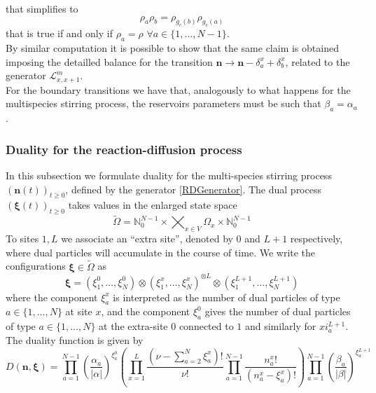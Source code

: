 \documentclass[10pt]{article}
\numberwithin{equation}{section}
\numberwithin{equation}{subsection}
\begin{document}
that simplifies to 
\begin{equation}
	\rho_{a}\rho_{b}=\rho_{g_{c}(b)}\rho_{g_{c}(a)}
\end{equation}
that is true if and only if $\rho_{a}=\rho$ $\forall a\in \{1,\ldots,N-1\}$.\\
By similar computation it is possible to show that the same claim is obtained imposing the detailled balance for the transition $\bm{n}\to \bm{n}-\delta_{a}^{x}+\delta_{b}^{x}$, related to the generator $\mathcal{L}^{m}_{x,x+1}$. \\
For the boundary transitions we have that, analogously to what happens for the multispecies stirring process, the reservoirs parameters must be such that $\beta_{a}=\alpha_{a}$.
\subsubsection{Duality for the reaction-diffusion process}
In this subsection we formulate duality for the multi-species stirring process $(\bm{n}(t))_{t\geq 0}$, defined by the generator \eqref{RDGenerator}.
The dual  process $(\bm{\xi}(t))_{t\geq 0}$ takes values in the enlarged state space
\begin{equation}
	\widetilde{\Omega}=\mathbb{N}_{0}^{N-1}\times  \bigtimes_{x\in V} \Omega_{x}\times \mathbb{N}_{0}^{N-1}
\end{equation}
To sites $1,L$ we associate an ``extra site'', denoted by $0$ and $L+1$ respectively,
where dual particles will accumulate in the course of time. 
We write the configurations $\bm{\xi} \in \widetilde\Omega$  as
\begin{equation}
	\bm{\xi}=\left(\xi_{1}^{0},\ldots,\xi_{N}^{0}\right)\otimes\left(\xi_{1}^{x},\ldots,\xi_{N}^{x}\right)^{\otimes L}\otimes \left(\xi_{1}^{L+1},\ldots,\xi_{N}^{L+1}\right)
\end{equation}
where the component $\xi_{a}^{x}$ is interpreted as the number of dual particles of type $a\in \{1,\ldots,N\}$ at site $x$, 
and the component $\xi_{a}^{0}$  gives the number of dual particles of type $a\in \{1,\ldots,N\}$ at 
the extra-site $0$ connected to $1$ and similarly for $xi_{a}^{L+1}$. \\
The duality function is given by
\begin{equation}
	D(\bm{n},\bm{\xi})=\prod_{a=1}^{N-1}\left(\frac{\alpha_{a}}{|\alpha|}\right)^{\xi_{a}^{0}}\left(\prod_{x=1}^{L}\frac{(\nu -\sum_{a=2}^{N}\xi_{a}^{x})!}{\nu!}\prod_{a=1}^{N-1}\frac{n_{a}^{x}!}{(n_{a}^{x}-\xi_{a}^{x})!}\right)\prod_{a=1}^{N-1}\left(\frac{\beta_{a}}{|\beta|}\right)^{\xi_{a}^{L+1}}
\end{equation}
\end{document}
